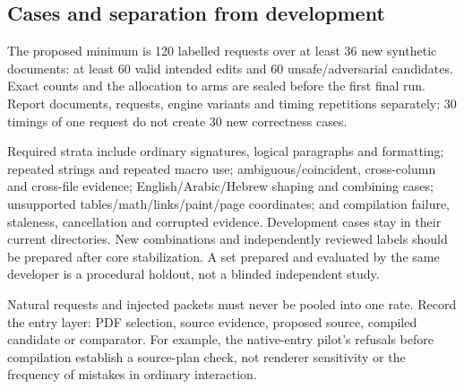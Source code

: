 \subsection{Cases and separation from development}
The proposed minimum is 120 labelled requests over at least 36 new synthetic
documents: at least 60 valid intended edits and 60 unsafe/adversarial candidates.
Exact counts and the allocation to arms are sealed before the first final run.
Report documents, requests, engine variants and timing repetitions separately;
30 timings of one request do not create 30 new correctness cases.

Required strata include ordinary signatures, logical paragraphs and formatting;
repeated strings and repeated macro use; ambiguous/coincident, cross-column
and cross-file evidence; English/Arabic/Hebrew shaping and combining cases;
unsupported tables/math/links/paint/page coordinates; and compilation failure,
staleness, cancellation and corrupted evidence. Development cases stay in
their current directories. New combinations and independently reviewed labels
should be prepared after core stabilization. A set prepared and evaluated by
the same developer is a procedural holdout, not a blinded independent study.

Natural requests and injected packets must never be pooled into one rate.
Record the entry layer: PDF selection, source evidence, proposed source,
compiled candidate or comparator. For example, the native-entry pilot's
refusals before compilation establish a source-plan check, not renderer
sensitivity or the frequency of mistakes in ordinary interaction.

